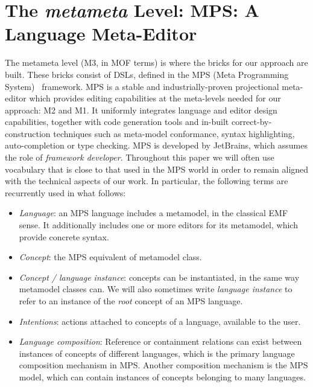 \section{The \emph{metameta} Level: MPS: A Language Meta-Editor}
\label{sec:metameta}
\vspace{-.3cm}
The metameta level (M3, in MOF terms) is where the bricks for our approach are
built. These bricks consist of DSLs, defined in the MPS (Meta Programming
System)~\cite{mps} framework. MPS is a stable and industrially-proven
projectional meta-editor which provides editing capabilities at the meta-levels
needed for our approach: M2 and M1. It uniformly integrates language and editor
design capabilities, together with code generation tools and in-built
correct-by-construction techniques such as meta-model conformance, syntax
highlighting, auto-completion or type checking.
MPS is developed by JetBrains, which assumes the role of \emph{framework
developer}.
Throughout this paper we will often use vocabulary that is close to that used in
the MPS world in order to remain aligned with the technical aspects of our
work. In particular, the following terms are recurrently used in what follows:
\vspace{-.3cm}
\begin{itemize}
  \item \emph{Language}: an MPS language includes a metamodel, in the classical
  EMF sense. It additionally includes one or more editors for its metamodel,
  which provide concrete syntax.
  \item \emph{Concept}: the MPS equivalent of metamodel class.
  \item \emph{Concept / language instance}: concepts can be instantiated, in
  the same way metamodel classes can. We will also sometimes write
  \emph{language instance} to refer to an instance of the \emph{root} concept of
  an MPS language.
  \item \emph{Intentions}: actions attached to
  concepts of a language, available to the user. 
  \item \emph{Language composition}:  Reference or containment relations can exist between instances of
  concepts of different languages, which is the primary language composition
  mechanism in MPS.
 Another composition mechanism is the MPS model, which can contain instances of
 concepts belonging to many languages.
\end{itemize}
\vspace{-.7cm}
